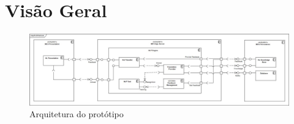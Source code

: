 \section{Visão Geral} 
\label{sec:chap04_general_vision}

\begin{figure}
    \centering
    \includegraphics[width=\textwidth]{ch04/assets/Architecture.jpg}
    \caption{Arquitetura do protótipo}
    \label{fig:prototype_architecture}
\end{figure}

\tbd 